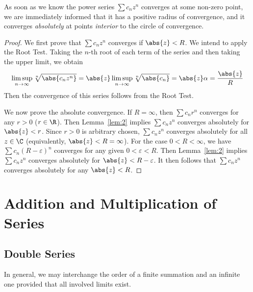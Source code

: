\documentclass[thmcnt=section, 12pt]{elegantbook}
\begin{document}
\begin{remark}
    As soon as we know the power series $\sum c_n z^n$ converges at some non-zero point, we are immediately informed that it has a positive radius of convergence, and it converges \textit{absolutely} at points \textit{interior} to the circle of convergence.
\end{remark}

\begin{proof}
    We first prove that $\sum c_n z^n$ converges if $\abs{z} < R$. We intend to apply the Root Test. Taking the $n$-th root of each term of the series and then taking the upper limit, we obtain
    \begin{align*}
        \limsup_{n \to \infty} \sqrt[n]{\abs{c_n z^n}}
        = \abs{z} \limsup_{n \to \infty} \sqrt[n]{\abs{c_n}}
        = \abs{z} \alpha 
        = \frac{\abs{z}}{R}  
    \end{align*}
    Then the convergence of this series follows from the Root Test.

    \par We now prove the absolute convergence. If $R = \infty$, then $\sum c_n r^n$ converges for any $r > 0$ ($ r \in \R$). Then Lemma~\ref{lem:2} implies $\sum c_n z^n$ converges absolutely for $\abs{z} < r$. Since $r > 0$ is arbitrary chosen, $\sum c_n z^n$ converges absolutely for all $z \in \C$ (equivalently, $\abs{z} < R = \infty$). For the case $0 < R < \infty$, we have $\sum c_n (R - \varepsilon)^n$ converges for any given $0 < \varepsilon < R$. Then Lemma~\ref{lem:2} implies $\sum c_n z^n$ converges absolutely for $\abs{z} < R - \varepsilon$. It then follows that $\sum c_n z^n$ converges absolutely for any $\abs{z} < R$.
\end{proof}


\section{Addition and Multiplication of Series}


\subsection{Double Series}


\par In general, we may interchange the order of a finite summation and an infinite one provided that all involved limits exist.
\end{document}
